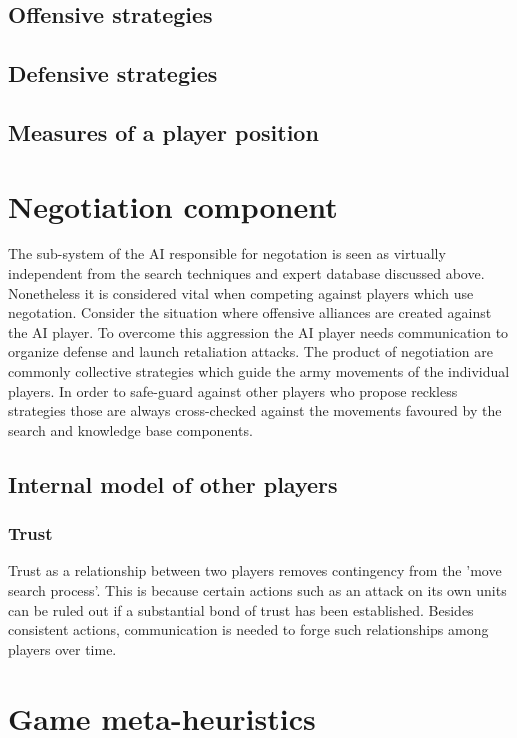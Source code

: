 \documentclass[12pt]{article}
\begin{document}
\subsection{Offensive strategies}

\subsection{Defensive strategies}

\subsection{Measures of a player position}


\section{Negotiation component}

The sub-system of the AI responsible for negotation
is seen as virtually independent from the search techniques
and expert database discussed above. Nonetheless it is 
considered vital when competing against players which
use negotation. Consider the situation where offensive alliances
are created against the AI player. To overcome this aggression 
the AI player needs communication to organize defense and launch
retaliation attacks. The product of negotiation are commonly
collective strategies which guide the army movements of the
individual players. In order to safe-guard against other
players who propose reckless strategies those are always
cross-checked against the movements favoured by the search
and knowledge base components.

\subsection{Internal model of other players}

\subsubsection{Trust}

Trust as a relationship between two players removes contingency
from the 'move search process'. This is because certain actions such
as an attack on its own units can be ruled out if a substantial bond of trust
has been established. Besides consistent actions, communication
is needed to forge such relationships among players over time. 

\section{Game meta-heuristics}
\end{document}
